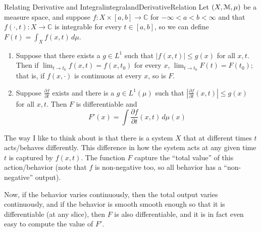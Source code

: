 \documentclass[oneside]{book}
\renewcommand{\C}{\mathbb{C}}
\newcommand{\EM}{\EuScript{M}}
\newcommand{\rw}{\rightarrow}
\begin{document}
\begin{thm}{Relating Derivative and Integral}{integralandDerivativeRelation}
	Let $(X, \EM, \mu)$ be a measure space, and suppose $f: X\times [a,b] \rw \C$ for $-\infty < a<b<\infty$ and that
	$f(\cdot, t): X \rw \C$ is integrable for every $t \in [a,b]$, so we can define $F(t) = \int_X f(x,t)\,d\mu$.
	\begin{enumerate}
		\item Suppose that there exists a $g \in L^1$ such that $|f(x,t)| \le g(x)$ for all $x,t$. Then if $\lim_{t \rw
			t_0} f(x, t) = f(x, t_0)$ for every $x$, $\lim_{t \rw t_0} F(t) = F(t_0)$; that is, if $f(x, \cdot)$ is
			continuous at every $x$, so is $F$. 
		\item Suppose $\frac{\partial f}{\partial t}$ exists and there is a $g \in L^1(\mu)$ such that
			$\left|\frac{\partial f}{\partial t}(x,t)\right| \le g(x)$ for all $x,t$. Then $F$ is differentiable and
			\[
				F'(x) = \int \frac{\partial f}{\partial t}(x,t)\,d\mu(x)
			\]
	\end{enumerate}
\end{thm}

The way I like to think about is that there is a system $X$ that at different times $t$ acts/behaves differently. This
difference in how the system acts at any given time $t$ is captured by $f(x,t)$. The function $F$ capture the ``total
value'' of this action/behavior (note that $f$ is non-negative too, so all behavior has a ``non-negative'' output). 

Now, if the behavior varies continuously, then the total output varies continuously, and if the behavior is smooth
smooth enough so that it is differentiable (at any slice), then $F$ is also differentiable, and it is in fact even easy
to compute the value of $F'$. 
\end{document}
